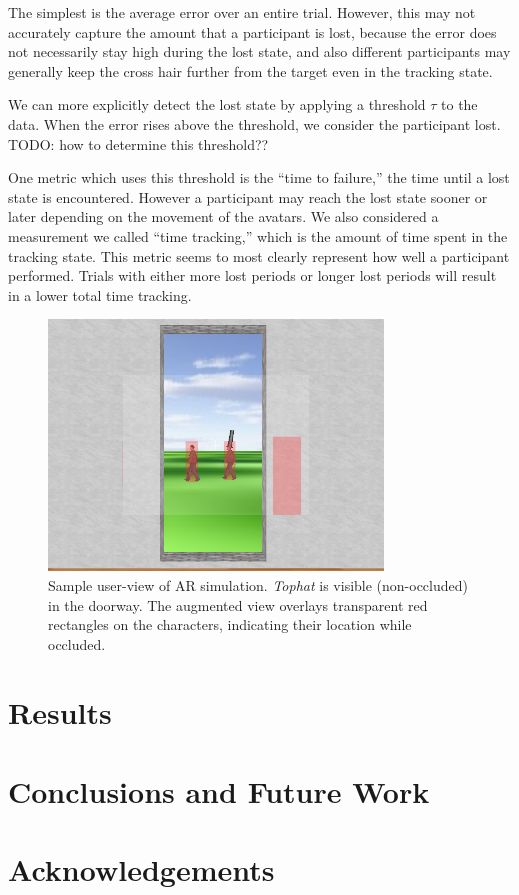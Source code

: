 \documentclass{acmsiggraph}                     %
\begin{document}
The simplest is the average error over an entire trial.  However, this may not accurately capture the amount that a participant is lost, because the error does not necessarily stay high during the lost state, and also different participants may generally keep the cross hair further from the target even in the tracking state.

We can more explicitly detect the lost state by applying a threshold $\tau$ to the data.  When the error rises above the threshold, we consider the participant lost.  TODO: how to determine this threshold??

One metric which uses this threshold is the ``time to failure,'' the time until a lost state is encountered.  However a participant may reach the lost state sooner or later depending on the movement of the avatars.  We also considered a measurement we called ``time tracking,'' which is the amount of time spent in the tracking state.  This metric seems to most clearly represent how well a participant performed.  Trials with either more lost periods or longer lost periods will result in a lower total time tracking.

\begin{figure}[ht!]
	\centering
	\includegraphics[width=3.5in]{figures/tophatscreenshot.png}
	\caption{Sample user-view of AR simulation.  \emph{Tophat} is visible (non-occluded) in the doorway.  The augmented view overlays transparent red rectangles on the characters, indicating their location while occluded.}
\end{figure}

\section{Results}

\section{Conclusions and Future Work}

\section*{Acknowledgements}


\nocite{*}

\end{document}
